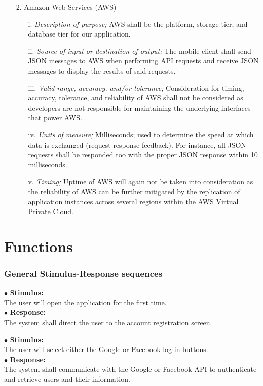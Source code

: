 \documentclass{scrreprt}
\begin{document}
\begin{enumerate}
	\item[2.] Amazon Web Services (AWS)
	\begin{itemize}
		\item[i.] \textit{Description of purpose;} AWS shall be the platform, storage tier, and database tier for our application. 
		\item[ii.] \textit{Source of input or destination of output;} The mobile client shall send JSON messages to AWS when performing API requests and receive JSON messages to display the results of said requests.
		\item[iii.] \textit{Valid range, accuracy, and/or tolerance;} Consideration for timing, accuracy, tolerance, and reliability of AWS shall not be considered as developers are not responsible for maintaining the underlying interfaces that power AWS.
		\item[iv.]  \textit{Units of measure;} Milliseconds; used to determine the speed at which data is exchanged (request-response feedback). For instance, all JSON requests shall be responded too with the proper JSON response within 10 milliseconds.
		\item[v.] \textit{Timing;} Uptime of AWS will again not be taken into consideration as the reliability of AWS can be further mitigated by the replication of application instances across several regions within the AWS Virtual Private Cloud.
	\end{itemize}
\end{enumerate}
\section{Functions}


\subsubsection{General Stimulus-Response sequences}
\vspace{4mm}
	$\bullet$ \textbf{Stimulus:} \\ \hspace{5mm} The user will open the application for the first time.\\
	$\bullet$ \textbf{Response:} \\ \hspace{5mm} The system shall direct the user to the account registration screen.

\vspace{4mm}
	\hspace{-4.75mm} $\bullet$ \textbf{Stimulus:} \\ \hspace{5mm} The user will select either the Google or Facebook log-in buttons.\\
	$\bullet$ \textbf{Response:} \\ \hspace{5mm} The system shall communicate with the Google or Facebook API to authenticate and retrieve users and their information.
\end{document}
